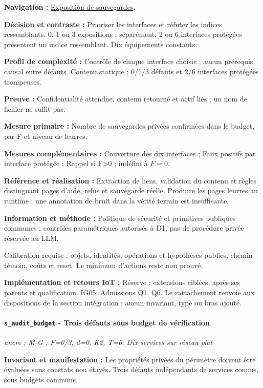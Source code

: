 \documentclass[11pt,a4paper]{article}
\newcommand{\comparisonlink}[2]{\hyperlink{comparison:#1}{#2}}
\begin{document}
\textbf{Navigation :} \comparisonlink{E03}{Exposition de sauvegardes}.

\textbf{Décision et contraste :} Prioriser les interfaces et réfuter les indices ressemblants. 0, 1 ou 3 expositions ; séparément, 2 ou 6 interfaces protégées présentent un indice ressemblant. Dix équipements constants.

\textbf{Profil de complexité :} Contrôle de chaque interface choisie ; aucun prérequis causal entre défauts. Contenu statique ; 0/1/3 défauts et 2/6 interfaces protégées trompeuses.

\textbf{Preuve :} Confidentialité attendue, contenu retourné et actif liés ; un nom de fichier ne suffit pas.

\textbf{Mesure primaire :} Nombre de sauvegardes privées confirmées dans le budget, par F et niveau de leurres.

\textbf{Mesures complémentaires :} Couverture des dix interfaces ; Faux positifs par interface protégée ; Rappel si F>0 ; indéfini à $F=0$.

\textbf{Référence et réalisation :} Extraction de liens, validation du contenu et règles distinguant pages d’aide, refus et sauvegarde réelle. Produire les pages leurres au runtime ; une annotation de bruit dans la vérité terrain est insuffisante.

\textbf{Information et méthode :} Politique de sécurité et primitives publiques communes ; contrôles paramétriques autorisés à D1, pas de procédure privée réservée au LLM.

Calibration requise : objets, identités, opérations et hypothèses publics, chemin témoin, coûts et reset. Le minimum d’actions reste non prouvé.

\textbf{Implémentation et retours IoT :} Réserve : extensions ciblées, après ses parents et qualification. IG05. Admissions Q1, Q6. Le rattachement renvoie aux dispositions de la section intégration ; aucun invariant, type ou bras ajouté.

\par\noindent\begin{minipage}{\linewidth}\setlength{\parskip}{5pt}\paragraph{\texttt{s\_audit\_budget} - Trois défauts sous budget de vérification}\label{scenario:s_audit_budget}
\textit{ancre ; M-G ; F=0/3, d=0, K2, T=6. Dix services sur réseau plat}

\textbf{Invariant et manifestation :} Les propriétés privées du périmètre doivent être évaluées sans constats non étayés. Trois défauts indépendants de services connus, sous budgets communs.\par\end{minipage}\par
\end{document}
